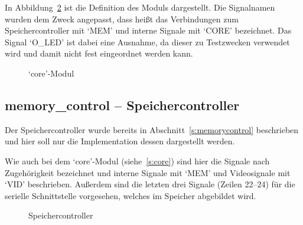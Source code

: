 In Abbildung~\ref{code:core} ist die Definition des Moduls dargestellt. Die
Signalnamen wurden dem Zweck angepasst, dass heißt das Verbindungen zum
Speichercontroller mit `MEM' und interne Signale mit `CORE' bezeichnet. Das
Signal `O\_LED' ist dabei eine Ausnahme, da dieser zu Testzwecken verwendet wird
und damit nicht fest eingeordnet werden kann.
\begin{figure}[htb]

\caption{`core'-Modul}
\label{code:core}
\end{figure}
\pagebreak
\subsection{memory\_control -- Speichercontroller}
\label{s:memcontrol}
Der Speichercontroller wurde bereits in Abschnitt~\ref{s:memorycontrol}
beschrieben und hier soll nur die Implementation dessen dargestellt werden.

Wie auch bei dem `core'-Modul (siehe~\ref{s:core}) sind hier die Signale nach
Zugehörigkeit bezeichnet und interne Signale mit `MEM' und Videosignale mit
`VID' beschrieben. Außerdem sind die letzten drei Signale (Zeilen 22--24) für
die serielle Schnittstelle vorgesehen, welches im Speicher abgebildet wird.
\begin{figure}[htb]

\caption{Speichercontroller}
\label{code:core}
\end{figure}
\pagebreak
